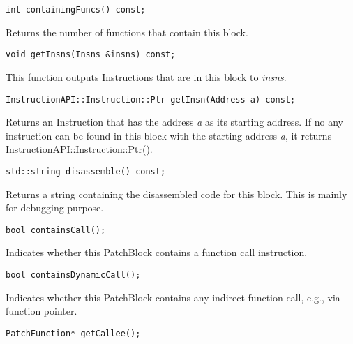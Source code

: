\begin{verbatim}
int containingFuncs() const;

\end{verbatim}



Returns the number of functions that contain this block.


\begin{verbatim}
void getInsns(Insns &insns) const;

\end{verbatim}



This function outputs Instructions that are in this block to \emph{insns}.


\begin{verbatim}
InstructionAPI::Instruction::Ptr getInsn(Address a) const;

\end{verbatim}



Returns an Instruction that has the address \emph{a} as its starting address. If no
any instruction can be found in this block with the starting address \emph{a}, it
returns InstructionAPI::Instruction::Ptr().


\begin{verbatim}
std::string disassemble() const;

\end{verbatim}



Returns a string containing the disassembled code for this block. This is mainly
for debugging purpose.


\begin{verbatim}
bool containsCall();

\end{verbatim}



Indicates whether this PatchBlock contains a function call instruction.


\begin{verbatim}
bool containsDynamicCall();

\end{verbatim}



Indicates whether this PatchBlock contains any indirect function call, e.g., via
function pointer.


\begin{verbatim}
PatchFunction* getCallee();

\end{verbatim}



